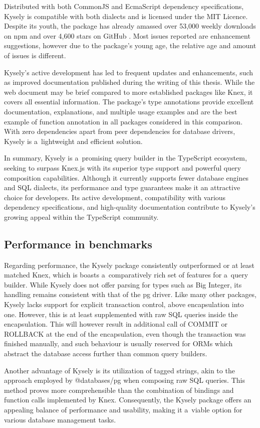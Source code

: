 Distributed with both CommonJS and EcmaScript dependency specifications, Kysely
is compatible with both dialects and is licensed under the MIT Licence. Despite
its youth, the package has already amassed over 53,000 weekly downloads on npm
and over 4,600 stars on GitHub \cite{kyselyGithub}. Most issues reported are
enhancement suggestions, however due to the package's young age, the relative
age and amount of issues is different.

Kysely's active development has led to frequent updates and enhancements, such
as improved documentation published during the writing of this thesis. While the
web document may be brief compared to more established packages like Knex, it
covers all essential information. The package's type annotations provide
excellent documentation, explanations, and multiple usage examples and are the
best example of function annotation in all packages considered in this
comparison. With zero dependencies apart from peer dependencies for database
drivers, Kysely is a~lightweight and efficient solution.

In summary, Kysely is a~promising query builder in the TypeScript ecosystem,
seeking to surpass Knex.js with its superior type support and powerful query
composition capabilities. Although it currently supports fewer database engines
and SQL dialects, its performance and type guarantees make it an attractive
choice for developers. Its active development, compatibility with various
dependency specifications, and high-quality documentation contribute to Kysely's
growing appeal within the TypeScript community.

\subsection*{Performance in benchmarks}

Regarding performance, the Kysely package consistently outperformed or at least
matched Knex, which is boasts a~comparatively rich set of features for a~query
builder. While Kysely does not offer parsing for types such as Big Integer, its
handling remains consistent with that of the pg driver. Like many other
packages, Kysely lacks support for explicit transaction control, above
encapsulation into one. However, this is at least supplemented with raw SQL
queries inside the encapsulation. This will however result in additional call of
COMMIT or ROLLBACK at the end of the encapsulation, even though the transaction
was finished manually, and such behaviour is usually reserved for ORMs which
abstract the database access further than common query builders.

Another advantage of Kysely is its utilization of tagged strings, akin to the
approach employed by @databases/pg when composing raw SQL queries. This method
proves more comprehensible than the combination of bindings and function calls
implemented by Knex. Consequently, the Kysely package offers an appealing
balance of performance and usability, making it a~viable option for various
database management tasks.
